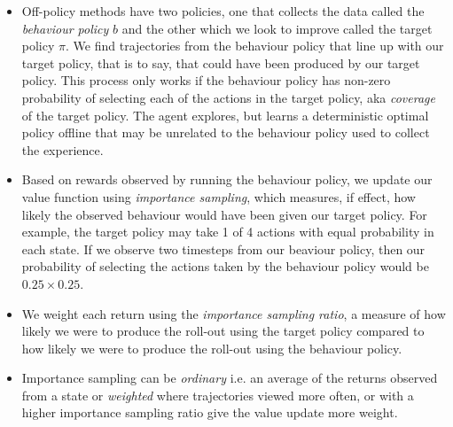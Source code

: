 \begin{itemize}
\item Off-policy methods have two policies, one that collects the data called the \textit{behaviour policy} $b$ and the other which we look to improve called the target policy $\pi$. We find trajectories from the behaviour policy that line up with our target policy, that is to say, that could have been produced by our target policy. This process only works if the behaviour policy has non-zero probability of selecting each of the actions in the target policy, aka \textit{coverage} of the target policy. The agent explores, but learns a deterministic optimal policy offline that may be unrelated to the behaviour policy used to collect the experience.
\item Based on rewards observed by running the behaviour policy, we update our value function using \textit{importance sampling}, which measures, if effect, how likely the observed behaviour would have been given our target policy. For example, the target policy may take 1 of 4 actions with equal probability in each state. If we observe two timesteps from our beaviour policy, then our probability of selecting the actions taken by the behaviour policy would be $0.25 \times 0.25$. 
\item We weight each return using the \textit{importance sampling ratio}, a measure of how likely we were to produce the roll-out using the target policy compared to how likely we were to produce the roll-out using the behaviour policy. 
\item Importance sampling can be \textit{ordinary} i.e. an average of the returns observed from a state or \textit{weighted} where trajectories viewed more often, or with a higher importance sampling ratio give the value update more weight.

\end{itemize}